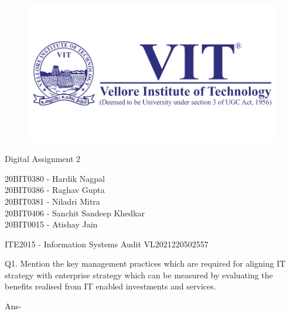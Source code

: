 \documentclass[12pt]{article}
\begin{document}
\begin{titlepage}
\NoBgThispage
   \begin{center}
        \begin{figure}[h] %
        \centering
        \includegraphics[width=15cm]{1583124354phpJTtnK5.png}
        \end{figure}

        \Huge{Digital Assignment 2}

        \vspace{0.5cm}
        \LARGE{20BIT0380 - Hardik Nagpal\\20BIT0386 - Raghav Gupta\\20BIT0381 - Niladri Mitra\\20BIT0406 - Sanchit Sandeep Khedkar\\20BIT0015 - Atishay Jain}
       
        \vspace{2.5 cm}

        \vspace{0.25 cm}
        \Large{ITE2015 - Information Systems Audit}
        \large{VL2021220502557}
       

       \vfill
    \end{center}
\end{titlepage}
\newpage
Q1. Mention the key management practices which are required for aligning IT strategy with enterprise strategy which can be measured by evaluating the benefits realised from IT enabled investments and services.
\par
Ans- \\
\end{document}
